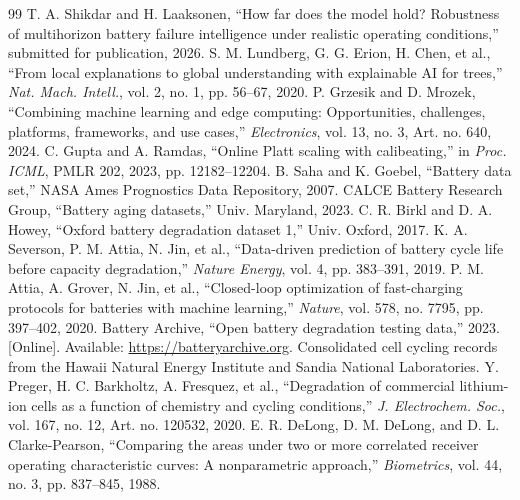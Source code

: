 \documentclass[preprint,12pt]{elsarticle}
\begin{document}
\begin{thebibliography}{99}
 T. A. Shikdar and H. Laaksonen, ``How far does the model hold? Robustness of multihorizon battery failure intelligence under realistic operating conditions,'' submitted for publication, 2026.
 S. M. Lundberg, G. G. Erion, H. Chen, et al., ``From local explanations to global understanding with explainable AI for trees,'' \emph{Nat. Mach. Intell.}, vol. 2, no. 1, pp. 56--67, 2020.
 P. Grzesik and D. Mrozek, ``Combining machine learning and edge computing: Opportunities, challenges, platforms, frameworks, and use cases,'' \emph{Electronics}, vol. 13, no. 3, Art. no. 640, 2024.
 C. Gupta and A. Ramdas, ``Online Platt scaling with calibeating,'' in \emph{Proc. ICML}, PMLR 202, 2023, pp. 12182--12204.
 B. Saha and K. Goebel, ``Battery data set,'' NASA Ames Prognostics Data Repository, 2007.
 CALCE Battery Research Group, ``Battery aging datasets,'' Univ. Maryland, 2023.
 C. R. Birkl and D. A. Howey, ``Oxford battery degradation dataset 1,'' Univ. Oxford, 2017.
 K. A. Severson, P. M. Attia, N. Jin, et al., ``Data-driven prediction of battery cycle life before capacity degradation,'' \emph{Nature Energy}, vol. 4, pp. 383--391, 2019.
 P. M. Attia, A. Grover, N. Jin, et al., ``Closed-loop optimization of fast-charging protocols for batteries with machine learning,'' \emph{Nature}, vol. 578, no. 7795, pp. 397--402, 2020.
 Battery Archive, ``Open battery degradation testing data,'' 2023. [Online]. Available: \url{https://batteryarchive.org}. Consolidated cell cycling records from the Hawaii Natural Energy Institute and Sandia National Laboratories.
 Y. Preger, H. C. Barkholtz, A. Fresquez, et al., ``Degradation of commercial lithium-ion cells as a function of chemistry and cycling conditions,'' \emph{J. Electrochem. Soc.}, vol. 167, no. 12, Art. no. 120532, 2020.
 E. R. DeLong, D. M. DeLong, and D. L. Clarke-Pearson, ``Comparing the areas under two or more correlated receiver operating characteristic curves: A nonparametric approach,'' \emph{Biometrics}, vol. 44, no. 3, pp. 837--845, 1988.
\end{thebibliography}
\end{document}
